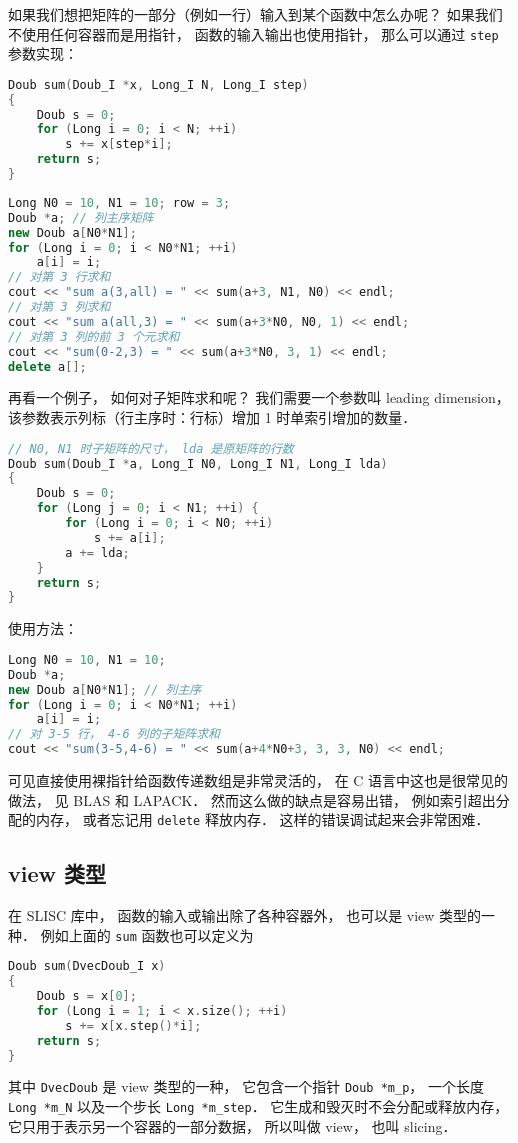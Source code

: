 

如果我们想把矩阵的一部分（例如一行）输入到某个函数中怎么办呢？ 如果我们不使用任何容器而是用指针， 函数的输入输出也使用指针， 那么可以通过 \verb|step| 参数实现：
\begin{lstlisting}[language=cpp]
Doub sum(Doub_I *x, Long_I N, Long_I step)
{
    Doub s = 0;
    for (Long i = 0; i < N; ++i)
        s += x[step*i];
    return s;
}
\end{lstlisting}

\begin{lstlisting}[language=cpp]
Long N0 = 10, N1 = 10; row = 3;
Doub *a; // 列主序矩阵
new Doub a[N0*N1];
for (Long i = 0; i < N0*N1; ++i)
    a[i] = i;
// 对第 3 行求和
cout << "sum a(3,all) = " << sum(a+3, N1, N0) << endl;
// 对第 3 列求和
cout << "sum a(all,3) = " << sum(a+3*N0, N0, 1) << endl;
// 对第 3 列的前 3 个元求和
cout << "sum(0-2,3) = " << sum(a+3*N0, 3, 1) << endl;
delete a[];
\end{lstlisting}
再看一个例子， 如何对子矩阵求和呢？ 我们需要一个参数叫 leading dimension， 该参数表示列标（行主序时：行标）增加 1 时单索引增加的数量．
\begin{lstlisting}[language=cpp]
// N0, N1 时子矩阵的尺寸， lda 是原矩阵的行数
Doub sum(Doub_I *a, Long_I N0, Long_I N1, Long_I lda)
{
    Doub s = 0;
    for (Long j = 0; i < N1; ++i) {
        for (Long i = 0; i < N0; ++i)
            s += a[i];
        a += lda;
    }
    return s;
}
\end{lstlisting}
使用方法：
\begin{lstlisting}[language=cpp]
Long N0 = 10, N1 = 10;
Doub *a;
new Doub a[N0*N1]; // 列主序
for (Long i = 0; i < N0*N1; ++i)
    a[i] = i;
// 对 3-5 行， 4-6 列的子矩阵求和
cout << "sum(3-5,4-6) = " << sum(a+4*N0+3, 3, 3, N0) << endl;
\end{lstlisting}
可见直接使用裸指针给函数传递数组是非常灵活的， 在 C 语言中这也是很常见的做法， 见 BLAS 和 LAPACK． 然而这么做的缺点是容易出错， 例如索引超出分配的内存， 或者忘记用 \verb|delete| 释放内存． 这样的错误调试起来会非常困难．

\subsection{view 类型}
在 SLISC 库中， 函数的输入或输出除了各种容器外， 也可以是 view 类型的一种． 例如上面的 \verb|sum| 函数也可以定义为
\begin{lstlisting}[language=cpp]
Doub sum(DvecDoub_I x)
{
    Doub s = x[0];
    for (Long i = 1; i < x.size(); ++i)
        s += x[x.step()*i];
    return s;
}
\end{lstlisting}
其中 \verb|DvecDoub| 是 view 类型的一种， 它包含一个指针 \verb|Doub *m_p|， 一个长度 \verb|Long *m_N| 以及一个步长 \verb|Long *m_step|． 它生成和毁灭时不会分配或释放内存， 它只用于表示另一个容器的一部分数据， 所以叫做 view， 也叫 slicing．

